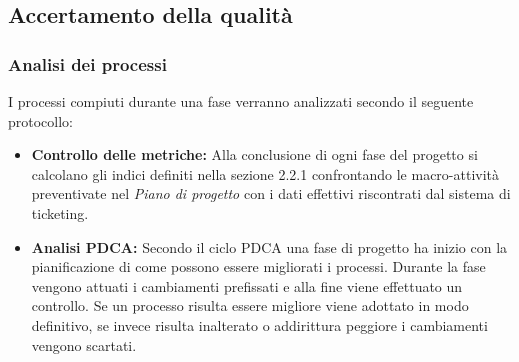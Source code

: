 \documentclass[a4paper]{article}
\begin{document}
				\subsection{Accertamento della qualità}
			
		\subsubsection{Analisi dei processi}
			I processi compiuti durante una fase verranno analizzati secondo il seguente protocollo:
			\begin{itemize}
				\item \textbf{Controllo delle metriche:}
					Alla conclusione di ogni fase del progetto si calcolano gli indici definiti nella sezione 2.2.1 confrontando 
						le macro-attività preventivate nel \emph{Piano di progetto} con i dati effettivi riscontrati dal sistema di ticketing.
				\item \textbf{Analisi PDCA:}
					Secondo il ciclo PDCA una fase di progetto ha inizio con la pianificazione di come possono essere migliorati i processi. 
					Durante la fase vengono attuati i cambiamenti prefissati e alla fine viene effettuato un controllo. Se un processo 
					risulta essere migliore viene adottato in modo definitivo, se invece risulta inalterato o addirittura peggiore i 
						cambiamenti vengono scartati.
			\end{itemize}
\end{document}
